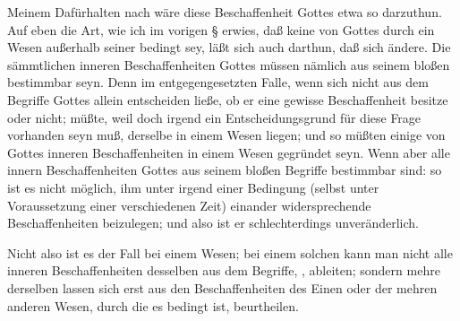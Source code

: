 \begin{aufza}
\item Meinem Dafürhalten nach wäre diese Beschaffenheit Gottes etwa so darzuthun. Auf eben die Art, wie ich im vorigen § erwies, daß keine von Gottes  durch ein Wesen außerhalb seiner bedingt sey, läßt sich auch darthun, daß  sich ändere. Die sämmtlichen inneren Beschaffenheiten Gottes müssen nämlich aus seinem bloßen  bestimmbar seyn. Denn im entgegengesetzten Falle, wenn sich nicht aus dem Begriffe Gottes allein entscheiden ließe, ob er eine gewisse Beschaffenheit besitze oder nicht; müßte, weil doch irgend ein Entscheidungsgrund für diese Frage vorhanden seyn muß, derselbe in einem  Wesen liegen; und so müßten einige von Gottes inneren Beschaffenheiten in einem  Wesen gegründet seyn. Wenn aber alle innern Beschaffenheiten Gottes aus seinem bloßen Begriffe bestimmbar sind: so ist es nicht möglich, ihm unter irgend einer Bedingung (selbst unter Voraussetzung einer verschiedenen Zeit) einander widersprechende Beschaffenheiten beizulegen; und also ist er schlechterdings unveränderlich.
\begin{RWanm}
Nicht also ist es der Fall bei einem  Wesen; bei einem solchen kann man nicht alle inneren Beschaffenheiten desselben aus dem Begriffe, , ableiten; sondern mehre derselben lassen sich erst aus den Beschaffenheiten des Einen oder der mehren anderen Wesen, durch die es bedingt ist, beurtheilen.
\end{RWanm}
\end{aufza}


